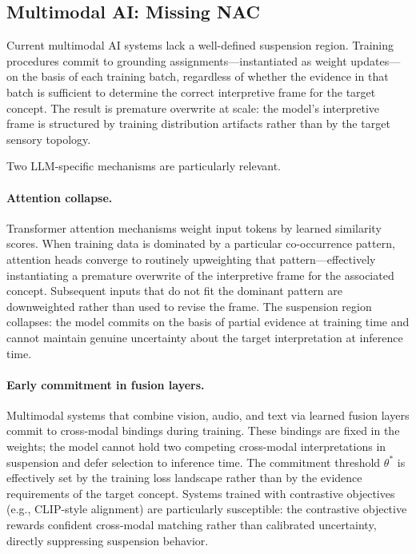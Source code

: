 \documentclass[12pt]{article}
\begin{document}
\subsection{Multimodal AI: Missing NAC}

Current multimodal AI systems lack a well-defined suspension region.
Training procedures commit to grounding assignments---instantiated as
weight updates---on the basis of each training batch, regardless of
whether the evidence in that batch is sufficient to determine the
correct interpretive frame for the target concept.
The result is premature overwrite at scale: the model's interpretive
frame is structured by training distribution artifacts rather than
by the target sensory topology.

Two LLM-specific mechanisms are particularly relevant.

\paragraph{Attention collapse.}
Transformer attention mechanisms weight input tokens by learned
similarity scores. When training data is dominated by a particular
co-occurrence pattern, attention heads converge to routinely
upweighting that pattern---effectively instantiating a premature
overwrite of the interpretive frame for the associated concept.
Subsequent inputs that do not fit the dominant pattern are
downweighted rather than used to revise the frame.
The suspension region collapses: the model commits on the basis
of partial evidence at training time and cannot maintain genuine
uncertainty about the target interpretation at inference time.

\paragraph{Early commitment in fusion layers.}
Multimodal systems that combine vision, audio, and text via learned
fusion layers commit to cross-modal bindings during training.
These bindings are fixed in the weights; the model cannot hold two
competing cross-modal interpretations in suspension and defer
selection to inference time.
The commitment threshold $\theta^*$ is effectively set by the
training loss landscape rather than by the evidence requirements
of the target concept.
Systems trained with contrastive objectives (e.g., CLIP-style
alignment) are particularly susceptible: the contrastive objective
rewards confident cross-modal matching rather than calibrated
uncertainty, directly suppressing suspension behavior.
\end{document}
